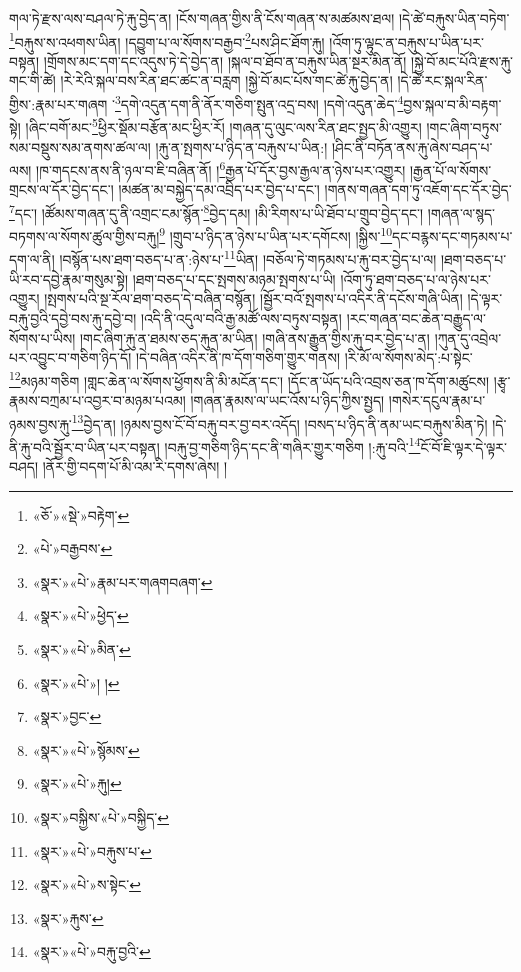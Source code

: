 གལ་ཏེ་རྫས་ལས་བཤལ་ཏེ་རྐུ་བྱེད་ན། །ངོས་གཞན་གྱིས་ནི་ངོས་གཞན་ས་མཚམས་ཐལ། །དེ་ཚེ་བརྐུས་ཡིན་བཏེག་\footnote{«ཅོ་»«སྡེ་»བརྟེག་}བརྐུས་ས་འཕགས་ཡིན། །དབྱུག་པ་ལ་སོགས་བརྒྱབ་\footnote{«པེ་»བརྒྱབས་}པས་ཤིང་ཐོག་རྐུ། །འོག་ཏུ་ལྟུང་ན་བརྐུས་པ་ཡིན་པར་བསྟན། །གྲོགས་མང་དག་དང་འདུས་ཏེ་དེ་བྱེད་ན། །སྐལ་བ་ཐོབ་ན་བརྐུས་ཡིན་སྔར་མིན་ནོ། །སྐྱེ་བོ་མང་པོའི་རྫས་རྐུ་གང་གི་ཚེ། །རེ་རེའི་སྐལ་བས་རིན་ཐང་ཚང་ན་བརླག །སྐྱེ་བོ་མང་པོས་གང་ཚེ་རྐུ་བྱེད་ན། །དེ་ཚེ་རང་སྐལ་རིན་གྱིས་:རྣམ་པར་གཞག ་\footnote{«སྣར་»«པེ་»རྣམ་པར་གཞགབཞག་}དགེ་འདུན་དག་ནི་ནོར་གཅིག་སྤུན་འདྲ་བས། །དགེ་འདུན་ཆེད་\footnote{«སྣར་»«པེ་»ཕྱེད་}བྱས་སྐལ་བ་མི་བརྟག་སྟེ། །ཞིང་བགོ་མང་\footnote{«སྣར་»«པེ་»མིན་}ཕྱིར་སྡོམ་བརྩོན་མང་ཕྱིར་རོ། །གཞན་དུ་ལུང་ལས་རིན་ཐང་སྤྱད་མི་འགྱུར། །གང་ཞིག་བཏུས་སམ་བསྡུས་སམ་ནགས་ཚལ་ལ། །རྐུ་ན་སྤགས་པ་ཉིད་ན་བརྐུས་པ་ཡིན:། །ཤིང་ནི་བཏོན་ནས་རྐུ་ཞེས་བཤད་པ་ལས། །ཁ་གདངས་ནས་ནི་ཉལ་བ་ཇི་བཞིན་ནོ། །\footnote{«སྣར་»«པེ་»། །}རྒྱན་པོ་དོར་བྱས་རྒྱལ་ན་ཉེས་པར་འགྱུར། །རྒྱན་པོ་ལ་སོགས་གྲངས་ལ་དོར་བྱེད་དང་། །མཚན་མ་བསྐྱེད་དམ་འབྲིད་པར་བྱེད་པ་དང་། །གནས་གཞན་དག་ཏུ་འཇོག་དང་དོར་བྱེད་\footnote{«སྣར་»བྱང་}དང་། །ཚོམས་གཞན་དུ་ནི་འགྲང་ངམ་སྙོན་\footnote{«སྣར་»«པེ་»སྙོམས་}བྱེད་དམ། །མི་རིགས་པ་ཡི་ཐོབ་པ་གྲུབ་བྱེད་དང་། །གཞན་ལ་སྙད་བཏགས་ལ་སོགས་ཚུལ་གྱིས་བརྐུ།\footnote{«སྣར་»«པེ་»རྐུ།} །གྲུབ་པ་ཉིད་ན་ཉེས་པ་ཡིན་པར་དགོངས། །སྐྱིས་\footnote{«སྣར་»བསྐྱིས་«པེ་»བསྐྱིད་}དང་བརྙས་དང་གཏམས་པ་དག་ལ་ནི། །བསྙོན་པས་ཐག་བཅད་པ་ན་:ཉེས་པ་\footnote{«སྣར་»«པེ་»བརྐུས་པ་}ཡིན། །བཅོལ་ཏེ་གཏམས་པ་རྐུ་བར་བྱེད་པ་ལ། །ཐག་བཅད་པ་ཡི་རབ་དབྱེ་རྣམ་གསུམ་སྟེ། །ཐག་བཅད་པ་དང་སྤགས་མཉམ་སྤགས་པ་ཡི། །འོག་ཏུ་ཐག་བཅད་པ་ལ་ཉེས་པར་འགྱུར། །སྤགས་པའི་སྔ་རོལ་ཐག་བཅད་དེ་བཞིན་བསྙོན། །སྦྱོར་བའོ་སྤགས་པ་འདིར་ནི་དངོས་གཞི་ཡིན། །དེ་ལྟར་བརྐུ་བྱའི་དབྱེ་བས་རྐུ་དབྱེ་བ། །འདི་ནི་འདུལ་བའི་རྒྱ་མཚོ་ལས་བཏུས་བསྟན། །རང་གཞན་བང་ཆེན་བརྒྱུད་ལ་སོགས་པ་ཡིས། །གང་ཞིག་རྐུ་ན་ཐམས་ཅད་རྐུན་མ་ཡིན། །གཞི་ནས་རྒྱུན་གྱིས་རྐུ་བར་བྱེད་པ་ན། །ཀུན་དུ་འབྲེལ་པར་འབྱུང་བ་གཅིག་ཉིད་དོ། །དེ་བཞིན་འདིར་ནི་ཁ་དོག་གཅིག་གྱུར་གནས། །རི་མོ་ལ་སོགས་མེད་:པ་སྟེང་\footnote{«སྣར་»«པེ་»ས་སྟེང་}མཉམ་གཅིག །གླང་ཆེན་ལ་སོགས་ཕྱོགས་ནི་མི་མངོན་དང་། །དོང་ན་ཡོད་པའི་འབྲས་ཅན་ཁ་དོག་མཚུངས། །རྩྭ་རྣམས་བཀྲམ་པ་འབྱར་བ་མཉམ་པའམ། །གཞན་རྣམས་ལ་ཡང་འོས་པ་ཉིད་ཀྱིས་སྤྱད། །གསེར་དངུལ་རྣམ་པ་ཉམས་བྱས་རྐུ་\footnote{«སྣར་»རྐུས་}བྱེད་ན། །ཉམས་བྱས་ངོ་བོ་བརྐུ་བར་བྱ་བར་འདོད། །བསད་པ་ཉིད་ནི་ནམ་ཡང་བརྐུས་མིན་ཏེ། །དེ་ནི་རྐུ་བའི་སྦྱོར་བ་ཡིན་པར་བསྟན། །བརྐུ་བྱ་གཅིག་ཉིད་དང་ནི་གཞིར་གྱུར་གཅིག །:རྐུ་བའི་\footnote{«སྣར་»«པེ་»བརྐུ་བྱའི་}ངོ་བོ་ཇི་ལྟར་དེ་ལྟར་བཤད། །ནོར་གྱི་བདག་པོ་མི་འམ་རི་དགས་ཞེས། །
